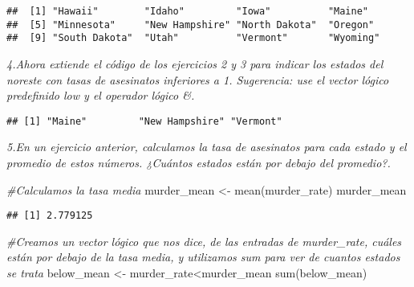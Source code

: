 \documentclass[
]{article}
\newenvironment{Shaded}{\begin{snugshade}}{\end{snugshade}}
\newcommand{\CommentTok}[1]{\textcolor[rgb]{0.56,0.35,0.01}{\textit{#1}}}
\newcommand{\FunctionTok}[1]{\textcolor[rgb]{0.00,0.00,0.00}{#1}}
\newcommand{\NormalTok}[1]{#1}
\newcommand{\OtherTok}[1]{\textcolor[rgb]{0.56,0.35,0.01}{#1}}
\newcommand{\SpecialCharTok}[1]{\textcolor[rgb]{0.00,0.00,0.00}{#1}}
\newcommand{\StringTok}[1]{\textcolor[rgb]{0.31,0.60,0.02}{#1}}
\begin{document}
\begin{verbatim}
##  [1] "Hawaii"        "Idaho"         "Iowa"          "Maine"        
##  [5] "Minnesota"     "New Hampshire" "North Dakota"  "Oregon"       
##  [9] "South Dakota"  "Utah"          "Vermont"       "Wyoming"
\end{verbatim}

\emph{4.Ahora extiende el código de los ejercicios 2 y 3 para indicar
los estados del noreste con tasas de asesinatos inferiores a 1.
Sugerencia: use el vector lógico predefinido low y el operador lógico
\&.}

\begin{Shaded}
\end{Shaded}

\begin{verbatim}
## [1] "Maine"         "New Hampshire" "Vermont"
\end{verbatim}

\emph{5.En un ejercicio anterior, calculamos la tasa de asesinatos para
cada estado y el promedio de estos números. ¿Cuántos estados están por
debajo del promedio?.}

\begin{Shaded}
\begin{Highlighting}[]
\CommentTok{\#Calculamos la tasa media}
\NormalTok{murder\_mean }\OtherTok{\textless{}{-}} \FunctionTok{mean}\NormalTok{(murder\_rate)}
\NormalTok{murder\_mean}
\end{Highlighting}
\end{Shaded}

\begin{verbatim}
## [1] 2.779125
\end{verbatim}

\begin{Shaded}
\begin{Highlighting}[]
\CommentTok{\#Creamos un vector lógico que nos dice, de las entradas de murder\_rate, cuáles están por debajo de la tasa media, y utilizamos sum para ver de cuantos estados se trata}
\NormalTok{below\_mean }\OtherTok{\textless{}{-}}\NormalTok{ murder\_rate}\SpecialCharTok{\textless{}}\NormalTok{murder\_mean}
\FunctionTok{sum}\NormalTok{(below\_mean)}
\end{Highlighting}
\end{Shaded}
\end{document}
